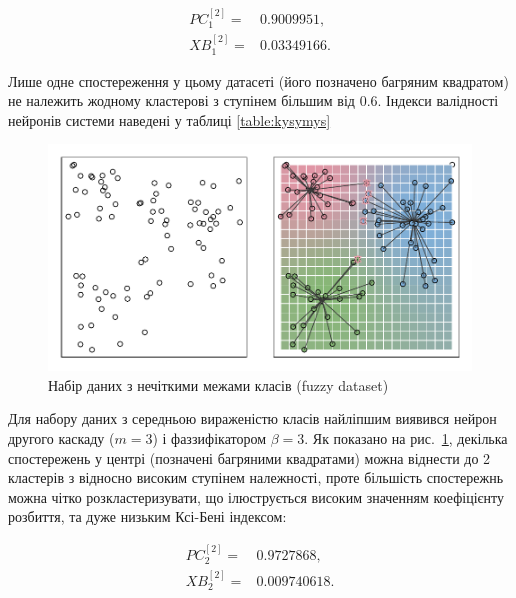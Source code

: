 \documentclass{vakthesis}
\begin{document}
\begin{equation*}
\begin{aligned}
PC_1^{[2]}=&0.9009951,\\
XB_1^{[2]}=&0.03349166.
\end{aligned}
\end{equation*}
\medskip

Лише одне спостереження у цьому датасеті (його позначено багряним квадратом) не належить жодному кластерові з ступінем більшим від $0.6$. Індекси валідності нейронів системи наведені у таблиці \ref{table:kysymys}

\begin{figure}
\begin{center}
\includegraphics{clustering03.pdf}
\caption{Набір даних з нечіткими межами класів (fuzzy dataset)}
\label{fig:clustering03}
\end{center}
\end{figure}

Для набору даних з середньою вираженістю класів найліпшим виявився нейрон другого каскаду ($m=3$) і фаззифікатором $\beta=3$. Як показано на рис.~\ref{fig:clustering03}, декілька спостережень у центрі (позначені багряними квадратами) можна віднести до 2 кластерів з відносно високим ступінем належності, проте більшість спостережнь можна чітко розкластеризувати, що ілюструється високим значенням коефіцієнту розбиття, та дуже низьким Ксі-Бені індексом:

\begin{equation*}
\begin{aligned}
PC_2^{[2]}=&0.9727868,\\
XB_2^{[2]}=&0.009740618.
\end{aligned}
\end{equation*}
\medskip
\end{document}
